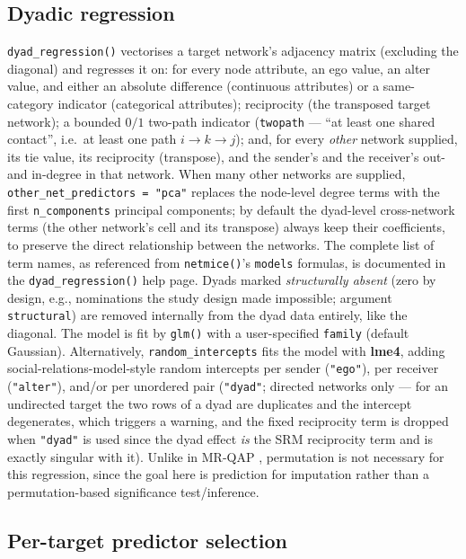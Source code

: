 \documentclass[11pt,a4paper]{article}
\newcommand{\pkg}[1]{\textbf{#1}}
\newcommand{\code}[1]{\texttt{#1}}
\begin{document}
\subsection{Dyadic regression}
\label{sec:dyad}

\code{dyad\_regression()} vectorises a target network's adjacency matrix
(excluding the diagonal) and regresses it on: for every node attribute, an
ego value, an alter value, and either an absolute difference (continuous
attributes) or a same-category indicator (categorical attributes); reciprocity (the
transposed target network); a bounded $0/1$ two-path indicator
(\code{twopath} --- ``at least one shared contact'', i.e.\ at least one
path $i \to k \to j$); and, for every
\emph{other} network supplied, its tie value, its reciprocity (transpose), and
the sender's and the receiver's out- and in-degree in that network. When
many other networks are supplied, \code{other\_net\_predictors = "pca"}
replaces the node-level degree terms with the first \code{n\_components}
principal components; by default the dyad-level cross-network terms (the other
network's cell and its transpose) always keep their coefficients,
to preserve the direct relationship between the networks. The complete list of term names, as referenced from
\code{netmice()}'s \code{models} formulas, is documented in the
\code{dyad\_regression()} help page. Dyads marked \emph{structurally
absent} (zero by design, e.g., nominations the study design made
impossible; argument \code{structural}) are removed internally from the dyad data
entirely, like the diagonal. The model is fit by \code{glm()} with a user-specified
\code{family} (default Gaussian). Alternatively, \code{random\_intercepts} fits the model
with \pkg{lme4}, adding social-relations-model-style random intercepts per
sender (\code{"ego"}), per receiver (\code{"alter"}), and/or per unordered
pair (\code{"dyad"}; directed networks only --- for an undirected target
the two rows of a dyad are duplicates and the intercept degenerates, which
triggers a warning, and the fixed reciprocity term is dropped when
\code{"dyad"} is used since the dyad effect \emph{is} the SRM reciprocity
term and is exactly singular with it). Unlike in MR-QAP \citep{Krackhardt1988},
permutation is not necessary for this regression, since the goal here is
prediction for imputation
rather than a permutation-based significance test/inference.

\subsection{Per-target predictor selection}
\label{sec:netquickpred}
\end{document}
